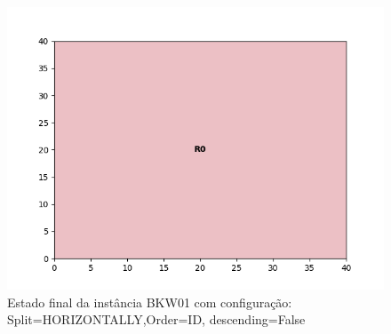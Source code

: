 \begin{figure}[H]
    \centering
    \caption[]{Estado final da instância BKW01 com configuração: Split=HORIZONTALLY,Order=ID, descending=False}
    \label{fig:bkw01-horizontally-id-false}
    \includegraphics[scale=0.5]{output/figures/bkw/bkw01/horizontally/id/false/00}
\end{figure}